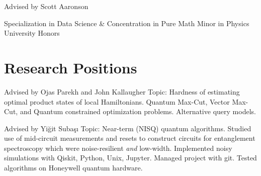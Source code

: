 \documentclass[11pt,letterpaper,serif]{moderncv}
\begin{document}
{
		\normalsize
		\begin{adjustwidth}{.25in}{}
			Advised by Scott Aaronson
		\end{adjustwidth}
}

{}{}

\smallskip

\vspace{-\parsep}
{
	\begin{adjustwidth}{.25in}{}
		Specialization in Data Science \&
		Concentration in Pure Math \newline
		Minor in Physics \newline
		University Honors
	\end{adjustwidth}
}

%
\section{Research Positions}
{
	\begin{adjustwidth}{.25in}{}
		Advised by Ojas Parekh and John Kallaugher \newline
		Topic: Hardness of estimating optimal product states of local Hamiltonians. Quantum Max-Cut, Vector Max-Cut, and Quantum constrained optimization problems.
		Alternative query models.
	\end{adjustwidth}
}

{
	\begin{adjustwidth}{.25in}{}
		Advised by Yi\u{g}it Suba\c{s}\i \newline
		Topic: Near-term (NISQ) quantum algorithms. Studied use of mid-circuit measurements and resets to construct circuits for entanglement spectroscopy which were noise-resilient \textit{and} low-width. \newline
		Implemented noisy simulations with Qiskit, Python, Unix, Jupyter. Managed project with git. Tested algorithms on Honeywell quantum hardware.
	\end{adjustwidth}
}
\end{document}
